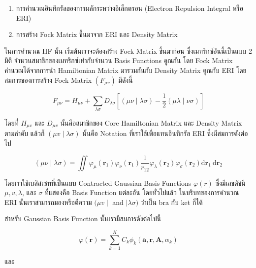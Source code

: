 \begin{enumerate}[topsep=0pt,noitemsep]
  \setlength\itemsep{1em}
  \item การคำนวณอินทิกรัลของการผลักระหว่างอิเล็กตรอน (Electron Repulsion Integral หรือ ERI)

  \item การสร้าง Fock Matrix ขึ้นมาจาก ERI และ Density Matrix
\end{enumerate}

ในการคำนวณ HF นั้น เริ่มต้นเราจะต้องสร้าง Fock Matrix ขึ้นมาก่อน ซึ่งเมทริกซ์อันนี้เป็นแบบ 2 มิติ จำนวนสมาชิกของเมทริกซ์เท่ากับจำนวน
Basis Functions คูณกัน โดย Fock Matrix คำนวณได้จากการนำ Hamiltonian Matrix มารวมกันกับ Density Matrix คูณกับ ERI
โดยสมการของการสร้าง Fock Matrix $(F_{\mu v})$ มีดังนี้

\begin{equation}
  F_{\mu \nu}
  =
  H_{\mu \nu}
  + \sum_{\lambda \sigma} D_{\lambda \sigma}\left[(\mu \nu \mid \lambda \sigma)
    - \frac{1}{2}(\mu \lambda \mid \nu \sigma)\right]
\end{equation}

\noindent โดยที่ $H_{\mu v}$ และ $D_{\mu v}$ นั้นคือสมาชิกของ Core Hamiltonian Matrix และ Density Matrix ตามลำดับ
แล้วก็ $(\mu v \mid \lambda \sigma)$ นั้นคือ Notation ที่เราใช้เพื่อแทนอินทิกรัล ERI ซึ่งมีสมการดังต่อไป

\begin{equation}
  (\mu \nu \mid \lambda \sigma)
  =
  \iint \varphi_\mu\left(\boldsymbol{r}_1\right) \varphi_\nu\left(\boldsymbol{r}_1\right)
  \frac{1}{r_{12}}
  \varphi_\lambda\left(\boldsymbol{r}_2\right) \varphi_\sigma\left(\boldsymbol{r}_2\right)
  \mathrm{d} \boldsymbol{r}_1 \mathrm{~d} \boldsymbol{r}_2
\end{equation}

\noindent โดยเราใช้เบสิสเซทที่เป็นแบบ Contracted Gaussian Basis Functions $\varphi(r)$ ซึ่งมีเลขดัชนี $\mu, v, \lambda$,
และ $\sigma$ ที่แสดงคือ Basis Function แต่ละอัน โดยทั่วไปแล้ว ในบริบทของการคำนวณ ERI นั้นเราสามารถมองหรือตีความ
$(\mu v \mid$ and $\mid \lambda \sigma)$ ว่าเป็น bra กับ ket ก็ได้

สำหรับ Gaussian Basis Function นั้นเรามีสมการดังต่อไปนี้

\begin{equation}
  \varphi(\boldsymbol{r})
  =
  \sum_{k=1}^K C_k \phi_k\left(\boldsymbol{a}, \boldsymbol{r}, \boldsymbol{A}, \alpha_k\right)
\end{equation}

\noindent และ

